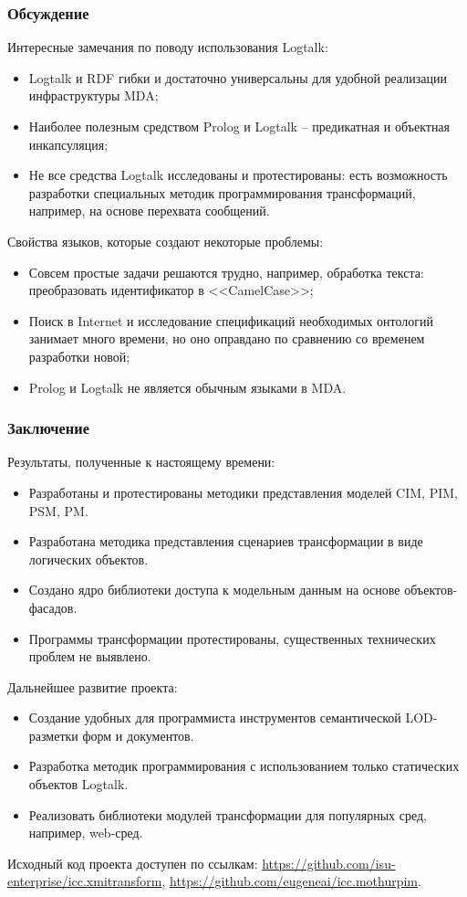 \documentclass[10pt]{beamer}
\begin{document}
\begin{frame}
  \frametitle{Обсуждение}
  Интересные замечания по поводу использования Logtalk:
  \begin{itemize}
  \item Logtalk и RDF гибки и достаточно универсальны для удобной реализации инфраструктуры MDA;
  \item Наиболее полезным средством Prolog и Logtalk -- предикатная и объектная инкапсуляция;
  \item Не все средства Logtalk исследованы и протестированы: есть возможность разработки специальных методик программирования трансформаций, например, на основе перехвата сообщений.
  \end{itemize}
  Свойства языков, которые создают некоторые проблемы:
  \begin{itemize}
  \item Совсем простые задачи решаются трудно, например, обработка текста: преобразовать идентификатор в <<CamelCase>>;
  \item Поиск в Internet и исследование спецификаций необходимых онтологий занимает много времени, но оно оправдано по сравнению со временем разработки новой;
  \item Prolog и Logtalk не является обычным языками в MDA.
  \end{itemize}
\end{frame}

\begin{frame}
  \frametitle{Заключение}
  Результаты, полученные к настоящему времени:
  \begin{itemize}
  \item Разработаны и протестированы методики представления моделей CIM, PIM, PSM, PM.
  \item Разработана методика представления сценариев трансформации в виде логических объектов.
  \item Создано ядро библиотеки доступа к модельным данным на основе объектов-фасадов.
  \item Программы трансформации протестированы, существенных технических проблем не выявлено.
  \end{itemize}
  Дальнейшее развитие проекта:
  \begin{itemize}
  \item Создание удобных для программиста инструментов семантической LOD-разметки форм и документов.
  \item Разработка методик программирования с использованием только статических объектов Logtalk.
  \item Реализовать библиотеки модулей трансформации для популярных сред, например, web-сред.
  \end{itemize}
  Исходный код проекта доступен по ссылкам: \url{https://github.com/isu-enterprise/icc.xmitransform}, \url{https://github.com/eugeneai/icc.mothurpim}.
\end{frame}
\end{document}
